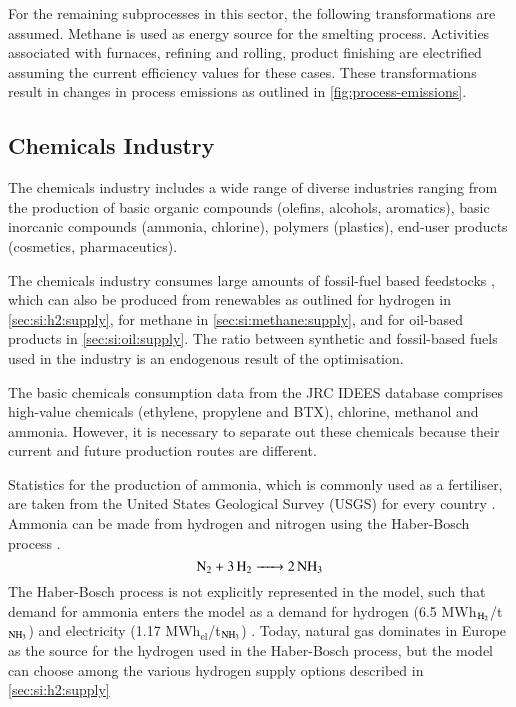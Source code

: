 For the remaining subprocesses in this sector, the following transformations are
assumed. Methane is used as energy source for the smelting process. Activities
associated with furnaces, refining and rolling, product finishing are
electrified assuming the current efficiency values for these cases.
These transformations result in changes in process emissions as outlined in \cref{fig:process-emissions}.

\subsection{Chemicals Industry}
\label{sec:si:industry:chemicals}

The chemicals industry includes a wide range of diverse industries ranging from
the production of basic organic compounds (olefins, alcohols, aromatics), basic
inorcanic compounds (ammonia, chlorine), polymers (plastics), end-user products
(cosmetics, pharmaceutics).

The chemicals industry consumes large amounts of fossil-fuel based feedstocks
, which can also be produced from renewables as
outlined for hydrogen in \cref{sec:si:h2:supply}, for methane in
\cref{sec:si:methane:supply}, and for oil-based products in
\cref{sec:si:oil:supply}. The ratio between synthetic and fossil-based fuels
used in the industry is an endogenous result of the optimisation.

The basic chemicals consumption data from the JRC IDEES  database
comprises high-value chemicals (ethylene, propylene and BTX), chlorine, methanol
and ammonia. However, it is necessary to separate out these chemicals because
their current and future production routes are different.

Statistics for the production of ammonia, which is commonly used as a
fertiliser, are taken from the United States Geological Survey (USGS) for every
country . Ammonia can
be made from hydrogen and nitrogen using the Haber-Bosch process .
\begin{equation}
    \ce{N2 + 3H2 -> 2NH3}
\end{equation}
The Haber-Bosch process is not explicitly represented in the model, such that
demand for ammonia enters the model as a demand for hydrogen (6.5
MWh$_{\ce{H2}}$/t$_{\ce{NH3}}$) and electricity (1.17 MWh$_{\text{el}}$/t$_{\ce{NH3}}$)
. Today, natural gas dominates in Europe as the source for
the hydrogen used in the Haber-Bosch process, but the model can choose among the
various hydrogen supply options described in
\cref{sec:si:h2:supply}

